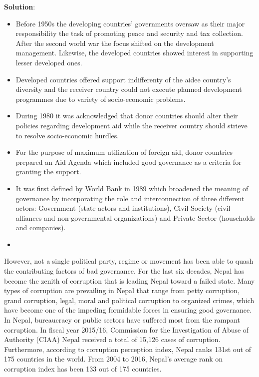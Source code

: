\documentclass[
  openany]{book}
\newenvironment{solution}{ {\bfseries Solution}:}{}
\begin{document}
\begin{questions}
\begin{solution}
\begin{itemize}
\item Before 1950s the developing countries' governments oversaw as their major responsibility the task of promoting peace and security and tax collection. After the second world war the focus shifted on the development management. Likewise, the developed countries showed interest in supporting lesser developed ones.
\item Developed countries offered support indifferenty of the aidee country's diversity and the receiver country could not execute planned development programmes due to variety of socio-economic problems.
\item During 1980 it was acknowledged that donor countries should alter their policies regarding development aid while the receiver country should strieve to resolve socio-economic hurdles.
\item For the purpose of maximum utilization of foreign aid, donor countries prepared an Aid Agenda which included good governance as a criteria for granting the support.
\item It was first defined by World Bank in 1989 which broadened the meaning of governance by incorporating the role and interconnection of three different actors: Government (state actors and institutions), Civil Society (civil alliances and non-governmental organizations) and Private Sector (households and companies).
\item 
\end{itemize}

However, not a single political party, regime or movement has been able to quash the contributing factors of bad governance. For the last six decades, Nepal has become the zenith of corruption that is leading Nepal toward a failed state. Many types of corruption are prevailing in Nepal that range from petty corruption, grand corruption, legal, moral and political corruption to organized crimes, which have become one of the impeding formidable forces in ensuring good governance. In Nepal, bureaucracy or public sectors have suffered most from the rampant corruption. In fiscal year 2015/16, Commission for the Investigation of Abuse of Authority (CIAA) Nepal received a total of 15,126 cases of corruption.  Furthermore, according to corruption perception index, Nepal ranks 131st out of 175 countries in the world. From 2004 to 2016, Nepal’s average rank on corruption index has been 133 out of 175 countries.

\end{solution}


\end{questions}
\end{document}
